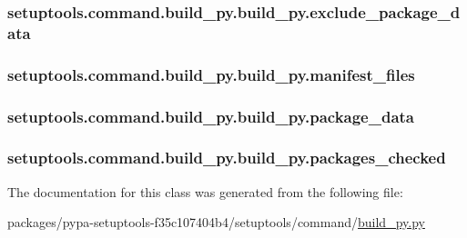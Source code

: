 \subsubsection[{exclude\+\_\+package\+\_\+data}]{\setlength{\rightskip}{0pt plus 5cm}setuptools.\+command.\+build\+\_\+py.\+build\+\_\+py.\+exclude\+\_\+package\+\_\+data}\label{classsetuptools_1_1command_1_1build__py_1_1build__py_a33b6b204c8d3b70c09bbe86665dc15ec}
\hypertarget{classsetuptools_1_1command_1_1build__py_1_1build__py_a66ea87dce6b5b5419f1558828bb92080}{}
\subsubsection[{manifest\+\_\+files}]{\setlength{\rightskip}{0pt plus 5cm}setuptools.\+command.\+build\+\_\+py.\+build\+\_\+py.\+manifest\+\_\+files}\label{classsetuptools_1_1command_1_1build__py_1_1build__py_a66ea87dce6b5b5419f1558828bb92080}
\hypertarget{classsetuptools_1_1command_1_1build__py_1_1build__py_a8f8100423fe5e05b57219cc00bf02568}{}
\subsubsection[{package\+\_\+data}]{\setlength{\rightskip}{0pt plus 5cm}setuptools.\+command.\+build\+\_\+py.\+build\+\_\+py.\+package\+\_\+data}\label{classsetuptools_1_1command_1_1build__py_1_1build__py_a8f8100423fe5e05b57219cc00bf02568}
\hypertarget{classsetuptools_1_1command_1_1build__py_1_1build__py_a748973ff26b6980cef5282fa66c3ba38}{}
\subsubsection[{packages\+\_\+checked}]{\setlength{\rightskip}{0pt plus 5cm}setuptools.\+command.\+build\+\_\+py.\+build\+\_\+py.\+packages\+\_\+checked}\label{classsetuptools_1_1command_1_1build__py_1_1build__py_a748973ff26b6980cef5282fa66c3ba38}


The documentation for this class was generated from the following file\+:\begin{DoxyCompactItemize}
\item 
packages/pypa-\/setuptools-\/f35c107404b4/setuptools/command/\hyperlink{build__py_8py}{build\+\_\+py.\+py}\end{DoxyCompactItemize}
